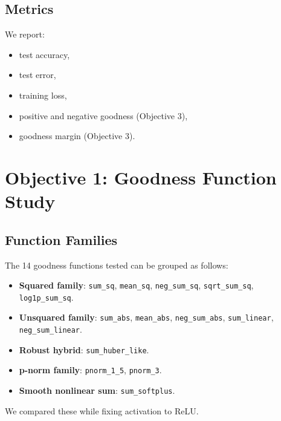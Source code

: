 \documentclass[sigconf]{acmart}
\begin{document}
\subsection{Metrics}
We report:
\begin{itemize}
  \item test accuracy,
  \item test error,
  \item training loss,
  \item positive and negative goodness (Objective 3),
  \item goodness margin (Objective 3).
\end{itemize}

\section{Objective 1: Goodness Function Study}
\subsection{Function Families}
The 14 goodness functions tested can be grouped as follows:
\begin{itemize}
  \item \textbf{Squared family}: \texttt{sum\_sq}, \texttt{mean\_sq}, \texttt{neg\_sum\_sq}, \texttt{sqrt\_sum\_sq}, \texttt{log1p\_sum\_sq}.
  \item \textbf{Unsquared family}: \texttt{sum\_abs}, \texttt{mean\_abs}, \texttt{neg\_sum\_abs}, \texttt{sum\_linear}, \texttt{neg\_sum\_linear}.
  \item \textbf{Robust hybrid}: \texttt{sum\_huber\_like}.
  \item \textbf{p-norm family}: \texttt{pnorm\_1\_5}, \texttt{pnorm\_3}.
  \item \textbf{Smooth nonlinear sum}: \texttt{sum\_softplus}.
\end{itemize}

We compared these while fixing activation to ReLU.
\end{document}
